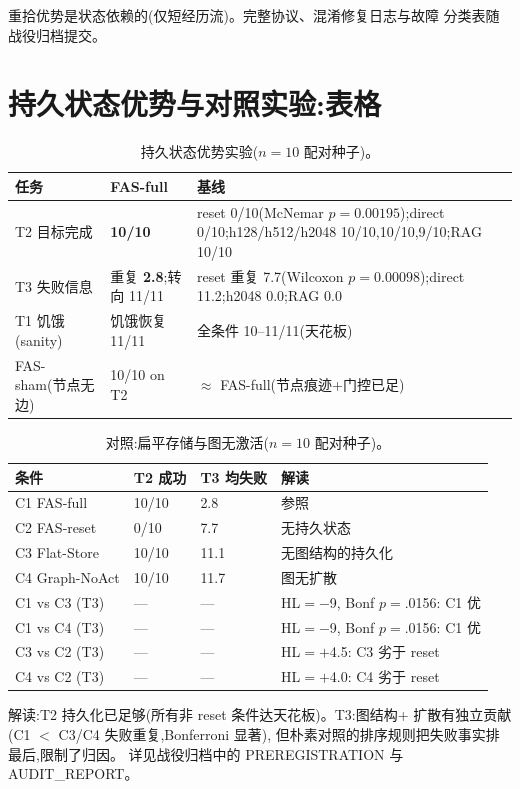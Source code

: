 \documentclass[10pt,a4paper]{ctexart}
\begin{document}
重拾优势是状态依赖的(仅短经历流)。完整协议、混淆修复日志与故障
分类表随战役归档提交。


\section{持久状态优势与对照实验:表格}
\label{s16:psa}

\begin{table}[h]
\centering\small
\caption{持久状态优势实验($n{=}10$ 配对种子)。}
\label{tab:s-psa-zh}
\begin{tabular}{L{4.2cm}L{4.2cm}L{5.6cm}}
\toprule
\textbf{任务} & \textbf{FAS-full} & \textbf{基线} \\
\midrule
T2 目标完成 & \textbf{10/10} & reset 0/10(McNemar $p{=}0.00195$);direct 0/10;h128/h512/h2048 10/10,10/10,9/10;RAG 10/10 \\
T3 失败信息 & 重复 \textbf{2.8};转向 11/11 & reset 重复 7.7(Wilcoxon $p{=}0.00098$);direct 11.2;h2048 0.0;RAG 0.0 \\
T1 饥饿(sanity) & 饥饿恢复 11/11 & 全条件 10--11/11(天花板) \\
\midrule
FAS-sham(节点无边) & 10/10 on T2 & $\approx$ FAS-full(节点痕迹+门控已足) \\
\bottomrule
\end{tabular}
\end{table}

\begin{table}[h]
\centering\small
\caption{对照:扁平存储与图无激活($n{=}10$ 配对种子)。}
\label{tab:s-controls-zh}
\begin{tabular}{L{3.0cm}L{3.0cm}L{3.0cm}L{5.4cm}}
\toprule
\textbf{条件} & \textbf{T2 成功} & \textbf{T3 均失败} & \textbf{解读} \\
\midrule
C1 FAS-full & 10/10 & 2.8 & 参照 \\
C2 FAS-reset & 0/10 & 7.7 & 无持久状态 \\
C3 Flat-Store & 10/10 & 11.1 & 无图结构的持久化 \\
C4 Graph-NoAct & 10/10 & 11.7 & 图无扩散 \\
\midrule
C1 vs C3 (T3) & --- & --- & HL${=}{-}$9, Bonf $p{=}$.0156: C1 优 \\
C1 vs C4 (T3) & --- & --- & HL${=}{-}$9, Bonf $p{=}$.0156: C1 优 \\
C3 vs C2 (T3) & --- & --- & HL${=}{+}$4.5: C3 劣于 reset \\
C4 vs C2 (T3) & --- & --- & HL${=}{+}$4.0: C4 劣于 reset \\
\bottomrule
\end{tabular}
\end{table}

解读:T2 持久化已足够(所有非 reset 条件达天花板)。T3:图结构+
扩散有独立贡献(C1 $<$ C3/C4 失败重复,Bonferroni 显著),
但朴素对照的排序规则把失败事实排最后,限制了归因。
详见战役归档中的 PREREGISTRATION 与 AUDIT\_REPORT。
\end{document}
